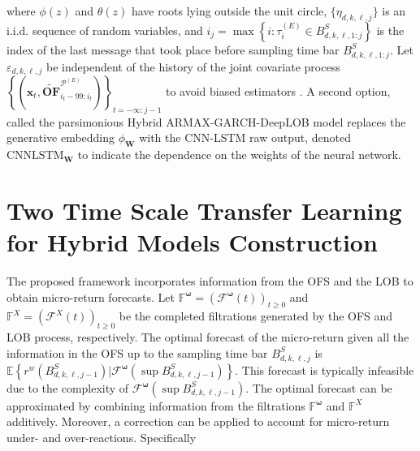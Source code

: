 \documentclass[10pt,a4paper,oneside]{article}
\newcommand{\E}{\mathbb{E}}
\newcommand{\SigAl}{\mathcal{F}}
\begin{document}
where \(\phi(z)\) and \(\theta(z)\) have roots lying outside the unit circle, \(\{\eta_{d, k, \ell, j}\}\) is an i.i.d. sequence of random variables, and $i_j = \max\left\{i : \tau^{(E)}_{i} \in B^S_{d, k, \ell, 1:j} \right\}$ is the index of the last message that took place before sampling time bar $B^S_{d, k, \ell, 1:j}$. Let \(\varepsilon_{d, k, \ell, j}\) be independent of the history of the joint covariate process \( \left\{ \left( \mathbf{x}_t, \widetilde{\mathbf{OF}}^{\mathcal{P}^{(E)}}_{i_{t} - 99:i_{t}} \right) \right\}_{t = -\infty : j - 1}\) to avoid biased estimators \citep[ch.~9]{hamilton_time_1994}. A second option, called the parsimonious Hybrid ARMAX-GARCH-DeepLOB model replaces the generative embedding $\phi_{\mathbf{W}}$ with the CNN-LSTM raw output, denoted $\mathrm{CNNLSTM}_{\mathbf{W}}$ to indicate the dependence on the weights of the neural network.


\section{Two Time Scale Transfer Learning for Hybrid Models Construction}
\label{sec:ttstl}

The proposed framework incorporates information from the OFS and the LOB to obtain micro-return forecasts. Let $\mathbb{F}^{\boldsymbol{\omega}} = \left ( \SigAl^{\boldsymbol{\omega}}(t) \right)_{t \geq 0}$ and $\mathbb{F}^{X} = \left( \SigAl^X(t) \right)_{t \geq 0}$ be the completed filtrations generated by the OFS and LOB process, respectively. The optimal forecast of the micro-return given all the information in the OFS up to the sampling time bar $B^S_{d,k,\ell,j}$ is $\E \left \{r^w\left( B^S_{d, k, \ell, j - 1} \right)  \big | \SigAl^{\boldsymbol{\omega}}\left(\sup B^S_{d, k, \ell, j - 1} \right) \right \}$. This forecast is typically infeasible due to the complexity of $\SigAl^{\boldsymbol{\omega}}\left(\sup B^S_{d, k, \ell, j - 1} \right)$. The optimal forecast can be approximated by combining information from the filtrations $\mathbb{F}^{\boldsymbol{\omega}}$ and $\mathbb{F}^{X}$ additively. Moreover, a correction can be applied to account for micro-return under- and over-reactions. Specifically
\end{document}
